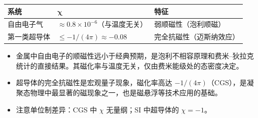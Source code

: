 
\begin{formulabox}[答案汇总]
\begin{center}
\begin{tabular}{lll}
\toprule
\textbf{系统} & $\boldsymbol{\chi}$ & \textbf{特征} \\
\midrule
自由电子气 & $\approx0.8\times10^{-6}$（与温度无关） & 弱顺磁性（泡利顺磁） \\
第一类超导体 & $\le-1/(4\pi)\approx-0.08$ & 完全抗磁性（迈斯纳效应） \\
\bottomrule
\end{tabular}
\end{center}
\end{formulabox}

\begin{insightbox}[物理图像]
\begin{itemize}
    \item 金属中自由电子的顺磁性远小于经典预期，是泡利不相容原理和费米--狄拉克统计的直接结果。其磁化率与温度无关，仅由费米能级处的态密度决定。
    \item 超导体的完全抗磁性是宏观量子现象，磁化率高达 $-1/(4\pi)$（CGS），是凝聚态物理中最显著的磁现象之一，也是磁悬浮等技术应用的基础。
    \item 注意单位制差异：CGS 中 $\chi$ 无量纲；SI 中超导体的 $\chi=-1$。
\end{itemize}
\end{insightbox}
